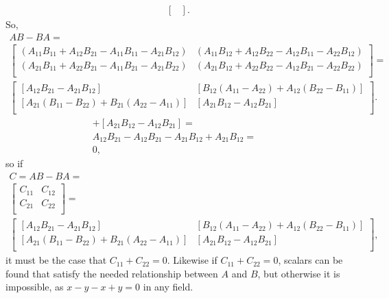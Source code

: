 \documentclass[12pt]{article}
\begin{document}
\begin{enumerate}
\begin{align*}
\begin{bmatrix}
      \end{bmatrix}.
    \end{align*}
    So,
    \begin{align*}
      AB - BA =&\\
      \begin{bmatrix}
        (A_{11}B_{11} + A_{12}B_{21} - A_{11}B_{11} - A_{21}B_{12}) &
        (A_{11}B_{12} + A_{12}B_{22} - A_{12}B_{11} - A_{22}B_{12})\\
        (A_{21}B_{11} + A_{22}B_{21} - A_{11}B_{21} - A_{21}B_{22}) &
        (A_{21}B_{12} + A_{22}B_{22} - A_{12}B_{21} - A_{22}B_{22})\\
      \end{bmatrix}
      =&\\
      \begin{bmatrix}
        [A_{12}B_{21} - A_{21}B_{12}] &
        [B_{12}(A_{11} - A_{22}) + A_{12}(B_{22} - B_{11})]\\
        [A_{21}(B_{11} - B_{22}) + B_{21}(A_{22} - A_{11})] &
        [A_{21}B_{12} - A_{12}B_{21}]\\
      \end{bmatrix}.
    \end{align*}
    \begin{align*}
      [A_{12}B_{21} - A_{21}B_{12}]
      + [A_{21}B_{12} - A_{12}B_{21}] =&\\
      A_{12}B_{21} - A_{12}B_{21}
      - A_{21}B_{12} + A_{21}B_{12} =&\\
      0,
    \end{align*}
    so if
    \begin{align*}
      C = AB - BA =&\\
      \begin{bmatrix}
        C_{11} & C_{12}\\
        C_{21} & C_{22}\\
      \end{bmatrix}
      =&\\
      \begin{bmatrix}
        [A_{12}B_{21} - A_{21}B_{12}] &
        [B_{12}(A_{11} - A_{22}) + A_{12}(B_{22} - B_{11})]\\
        [A_{21}(B_{11} - B_{22}) + B_{21}(A_{22} - A_{11})] &
        [A_{21}B_{12} - A_{12}B_{21}]\\
      \end{bmatrix},
    \end{align*}
    it must be the case that $C_{11} + C_{22} = 0$. Likewise if
    $C_{11} + C_{22} = 0$, scalars can be found that satisfy the
    needed relationship between $A$ and $B$, but otherwise it is
    impossible, as $x - y - x + y = 0$ in any field.
\end{enumerate}
\end{document}
